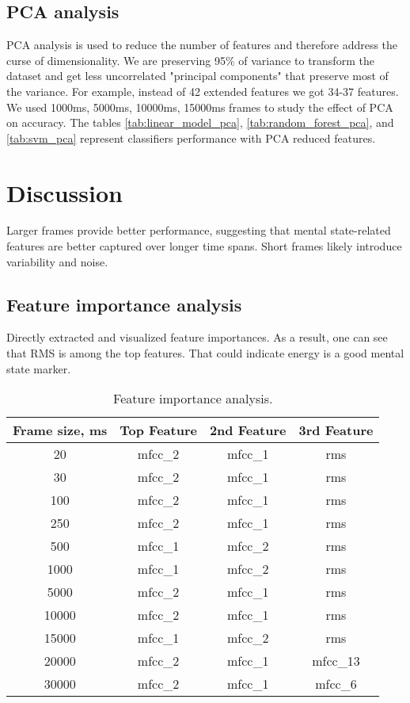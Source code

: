 \documentclass[conference]{IEEEtran}
\begin{document}
\subsection{PCA analysis}
PCA analysis is used to reduce the number of features and therefore address the curse of dimensionality. 
We are preserving 95\% of variance to transform the dataset and get less uncorrelated "principal components" that preserve most of the variance.
For example, instead of 42 extended features we got 34-37 features.
We used 1000ms, 5000ms, 10000ms, 15000ms frames to study the effect of PCA on accuracy.
The tables \ref{tab:linear_model_pca}, \ref{tab:random_forest_pca}, and \ref{tab:svm_pca} represent classifiers performance with PCA reduced features.

\section{Discussion}
Larger frames provide better performance, suggesting that mental state-related features are better captured over longer time spans. 
Short frames likely introduce variability and noise.

\subsection{Feature importance analysis}

Directly extracted and visualized feature importances. 
As a result, one can see that RMS is among the top features. 
That could indicate energy is a good mental state marker.

\begin{table}[h]
\centering
\caption{Feature importance analysis.}
\begin{tabular}{|c|c|c|c|}
\hline
\textbf{Frame size, ms} & \textbf{Top Feature} & \textbf{2nd Feature} & \textbf{3rd Feature}\\
\hline
20 & mfcc\_2 & mfcc\_1 & rms \\
\hline
30 & mfcc\_2 & mfcc\_1 & rms \\
\hline
100 & mfcc\_2 & mfcc\_1 & rms \\
\hline
250 & mfcc\_2 & mfcc\_1 & rms \\
\hline
500 & mfcc\_1 & mfcc\_2 & rms \\
\hline
1000 & mfcc\_1 & mfcc\_2 & rms \\
\hline
5000 & mfcc\_2 & mfcc\_1 & rms \\
\hline
10000 & mfcc\_2 & mfcc\_1 & rms \\
\hline
15000 & mfcc\_1 & mfcc\_2 & rms \\
\hline
20000 & mfcc\_2 & mfcc\_1 & mfcc\_13 \\
\hline
30000 & mfcc\_2 & mfcc\_1 & mfcc\_6 \\
\hline
\end{tabular}
\label{tab:feaure_importance}
\end{table}
\end{document}

